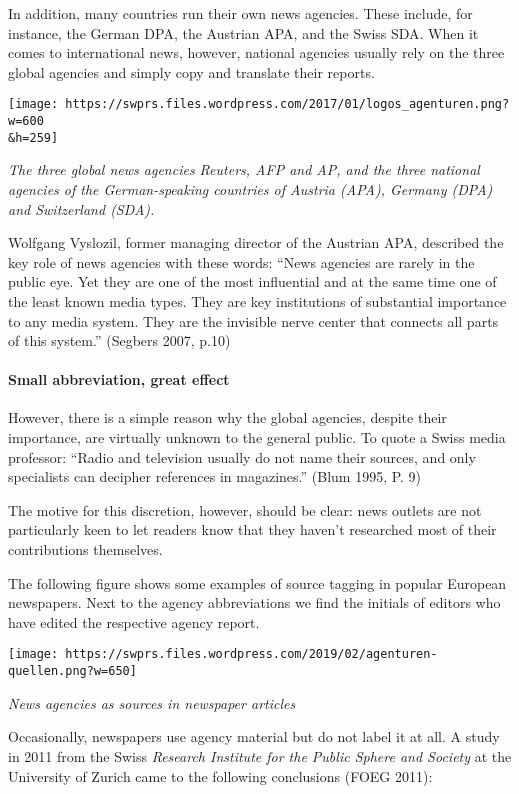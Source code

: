 In addition, many countries run their own news agencies. These include,
for instance, the German DPA, the Austrian APA, and the Swiss SDA. When
it comes to international news, however, national agencies usually rely
on the three global agencies and simply copy and translate their
reports.

\texttt{[image: https://swprs.files.wordpress.com/2017/01/logos\_agenturen.png?w=600\\\&h=259]}

\emph{The three global news agencies Reuters, AFP and AP, and the three
national agencies of the German-speaking countries of Austria (APA),
Germany (DPA) and Switzerland (SDA).}

Wolfgang Vyslozil, former managing director of the Austrian APA,
described the key role of news agencies with these words: ``News
agencies are rarely in the public eye. Yet they are one of the most
influential and at the same time one of the least known media types.
They are key institutions of substantial importance to any media system.
They are the invisible nerve center that connects all parts of this
system.'' (Segbers 2007, p.10)

\hypertarget{small-abbreviation-great-effect}{%
\paragraph{Small abbreviation, great
effect}\label{small-abbreviation-great-effect}}

However, there is a simple reason why the global agencies, despite their
importance, are virtually unknown to the general public. To quote a
Swiss media professor: ``Radio and television usually do not name their
sources, and only specialists can decipher references in magazines.''
(Blum 1995, P. 9)

The motive for this discretion, however, should be clear: news outlets
are not particularly keen to let readers know that they haven't
researched most of their contributions themselves.

The following figure shows some examples of source tagging in popular
European newspapers. Next to the agency abbreviations we find the
initials of editors who have edited the respective agency report.

\texttt{[image: https://swprs.files.wordpress.com/2019/02/agenturen-quellen.png?w=650]}

\emph{News agencies as sources in newspaper articles}

Occasionally, newspapers use agency material but do not label it at all.
A study in 2011 from the Swiss \emph{Research Institute for the Public
Sphere and Society} at the University of Zurich came to the following
conclusions (FOEG 2011):

